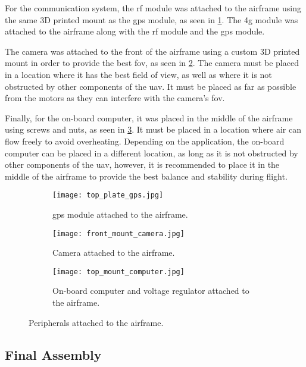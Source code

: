 For the communication system, the \gls{rf} module was attached to the airframe using the same 3D printed mount as the \gls{gps} module, as seen in \cref{fig:gps_attached_to_airframe}. The \gls{4g} module was attached to the airframe along with the \gls{rf} module and the \gls{gps} module.

The camera was attached to the front of the airframe using a custom 3D printed mount in order to provide the best \gls{fov}, as seen in \cref{fig:camera_attached_to_airframe}. The camera must be placed in a location where it has the best field of view, as well as where it is not obstructed by other components of the \gls{uav}. It must be placed as far as possible from the motors as they can interfere with the camera's \gls{fov}.

Finally, for the on-board computer, it was placed in the middle of the airframe using screws and nuts, as seen in \cref{fig:computer_attached_to_airframe}. It must be placed in a location where air can flow freely to avoid overheating. Depending on the application, the on-board computer can be placed in a different location, as long as it is not obstructed by other components of the \gls{uav}, however, it is recommended to place it in the middle of the airframe to provide the best balance and stability during flight.

\begin{figure}
  \hfill
  \begin{subfigure}[t]{0.3\linewidth}
    \texttt{[image: top\_plate\_gps.jpg]}
    \caption{\gls{gps} module attached to the airframe.}\label{fig:gps_attached_to_airframe}
  \end{subfigure}
  \hfill
  \begin{subfigure}[t]{0.3\linewidth}
    \texttt{[image: front\_mount\_camera.jpg]}
    \caption{Camera attached to the airframe.}\label{fig:camera_attached_to_airframe}
  \end{subfigure}
  \hfill
  \begin{subfigure}[t]{0.3\linewidth}
    \texttt{[image: top\_mount\_computer.jpg]}
    \caption{On-board computer and voltage regulator attached to the airframe.}\label{fig:computer_attached_to_airframe}
  \end{subfigure}
  \hfill

  \caption{Peripherals attached to the airframe.}\label{fig:peripherals_attached_to_airframe}
\end{figure}

\subsection{Final Assembly}\label{subsec:implementation_final_assembly}

